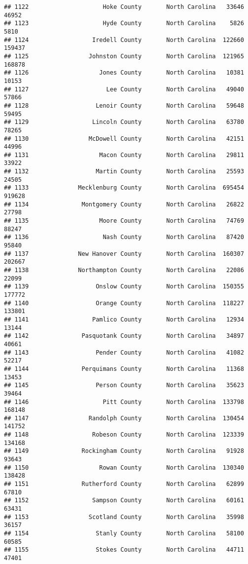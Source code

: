 \documentclass[
]{article}
\begin{document}
\begin{verbatim}
## 1122                     Hoke County       North Carolina   33646   46952
## 1123                     Hyde County       North Carolina    5826    5810
## 1124                  Iredell County       North Carolina  122660  159437
## 1125                 Johnston County       North Carolina  121965  168878
## 1126                    Jones County       North Carolina   10381   10153
## 1127                      Lee County       North Carolina   49040   57866
## 1128                   Lenoir County       North Carolina   59648   59495
## 1129                  Lincoln County       North Carolina   63780   78265
## 1130                 McDowell County       North Carolina   42151   44996
## 1131                    Macon County       North Carolina   29811   33922
## 1132                   Martin County       North Carolina   25593   24505
## 1133              Mecklenburg County       North Carolina  695454  919628
## 1134               Montgomery County       North Carolina   26822   27798
## 1135                    Moore County       North Carolina   74769   88247
## 1136                     Nash County       North Carolina   87420   95840
## 1137              New Hanover County       North Carolina  160307  202667
## 1138              Northampton County       North Carolina   22086   22099
## 1139                   Onslow County       North Carolina  150355  177772
## 1140                   Orange County       North Carolina  118227  133801
## 1141                  Pamlico County       North Carolina   12934   13144
## 1142               Pasquotank County       North Carolina   34897   40661
## 1143                   Pender County       North Carolina   41082   52217
## 1144               Perquimans County       North Carolina   11368   13453
## 1145                   Person County       North Carolina   35623   39464
## 1146                     Pitt County       North Carolina  133798  168148
## 1147                 Randolph County       North Carolina  130454  141752
## 1148                  Robeson County       North Carolina  123339  134168
## 1149               Rockingham County       North Carolina   91928   93643
## 1150                    Rowan County       North Carolina  130340  138428
## 1151               Rutherford County       North Carolina   62899   67810
## 1152                  Sampson County       North Carolina   60161   63431
## 1153                 Scotland County       North Carolina   35998   36157
## 1154                   Stanly County       North Carolina   58100   60585
## 1155                   Stokes County       North Carolina   44711   47401

\end{verbatim}
\end{document}
